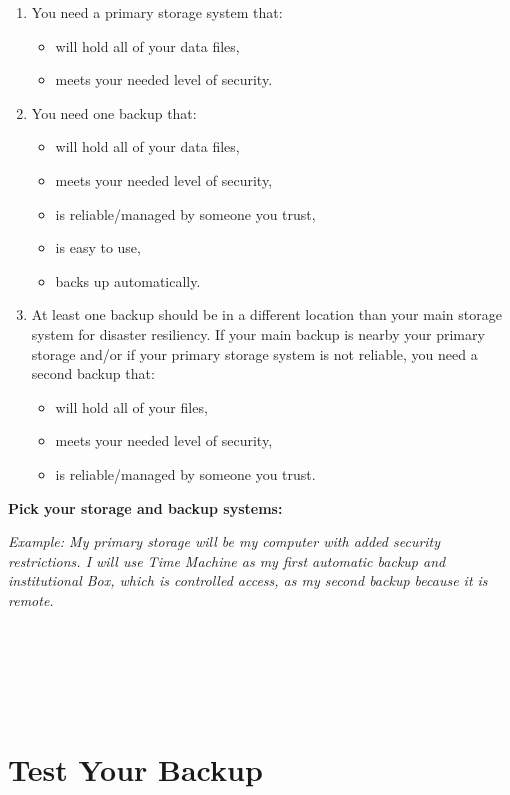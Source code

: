 \documentclass[
]{book}
\providecommand{\tightlist}{%
  \setlength{\itemsep}{0pt}\setlength{\parskip}{0pt}}
\begin{document}
\begin{enumerate}
\def\labelenumi{\arabic{enumi}.}
\tightlist
\item
  You need a primary storage system that:

  \begin{itemize}
  \tightlist
  \item
    will hold all of your data files,
  \item
    meets your needed level of security.
  \end{itemize}
\item
  You need one backup that:

  \begin{itemize}
  \tightlist
  \item
    will hold all of your data files,
  \item
    meets your needed level of security,
  \item
    is reliable/managed by someone you trust,
  \item
    is easy to use,
  \item
    backs up automatically.
  \end{itemize}
\item
  At least one backup should be in a different location than your main storage system for disaster resiliency. If your main backup is nearby your primary storage and/or if your primary storage system is not reliable, you need a second backup that:

  \begin{itemize}
  \tightlist
  \item
    will hold all of your files,
  \item
    meets your needed level of security,
  \item
    is reliable/managed by someone you trust.
  \end{itemize}
\end{enumerate}

\textbf{Pick your storage and backup systems:}

\emph{Example: My primary storage will be my computer with added security restrictions. I will use Time Machine as my first automatic backup and institutional Box, which is controlled access, as my second backup because it is remote.}

~

~

~

\hypertarget{backup}{%
\section{Test Your Backup}\label{backup}}
\end{document}
